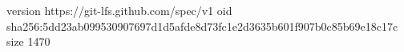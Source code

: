 version https://git-lfs.github.com/spec/v1
oid sha256:5dd23ab099530907697d1d5afde8d73fc1e2d3635b601f907b0c85b69e18c17c
size 1470
